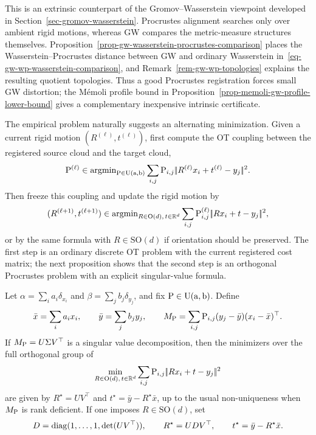 This is an extrinsic counterpart of the Gromov--Wasserstein viewpoint developed in Section~\ref{sec-gromov-wasserstein}. Procrustes alignment searches only over ambient rigid motions, whereas GW compares the metric-measure structures themselves. Proposition~\ref{prop-gw-wasserstein-procrustes-comparison} places the Wasserstein--Procrustes distance between GW and ordinary Wasserstein in~\eqref{eq-gw-wp-wasserstein-comparison}, and Remark~\ref{rem-gw-wp-topologies} explains the resulting quotient topologies. Thus a good Procrustes registration forces small GW distortion; the M\'emoli profile bound in Proposition~\ref{prop-memoli-gw-profile-lower-bound} gives a complementary inexpensive intrinsic certificate.

The empirical problem naturally suggests an alternating minimization. Given a current rigid motion $(R^{(\ell)},t^{(\ell)})$, first compute the OT coupling between the registered source cloud and the target cloud,
\begin{equation}\label{eq-wasserstein-procrustes-coupling-update}
	\P^{(\ell)}
	\in
	\argmin_{\P\in\CouplingsD(\a,\b)}
	\sum_{i,j}\P_{i,j}\norm{R^{(\ell)}x_i+t^{(\ell)}-y_j}^2.
\end{equation}
Then freeze this coupling and update the rigid motion by
\begin{equation}\label{eq-wasserstein-procrustes-rigid-update}
	(R^{(\ell+1)},t^{(\ell+1)})
	\in
	\argmin_{R\in\mathrm O(d),\,t\in\RR^d}
	\sum_{i,j}\P^{(\ell)}_{i,j}\norm{Rx_i+t-y_j}^2,
\end{equation}
or by the same formula with $R\in\mathrm{SO}(d)$ if orientation should be preserved. The first step is an ordinary discrete OT problem with the current registered cost matrix; the next proposition shows that the second step is an orthogonal Procrustes problem with an explicit singular-value formula.

\begin{prop}\label{prop-wasserstein-procrustes-rigid-update}
	Let $\alpha=\sum_i a_i\delta_{x_i}$ and $\beta=\sum_j b_j\delta_{y_j}$, and fix $\P\in\CouplingsD(\a,\b)$. Define
	\[
		\bar x=\sum_i a_i x_i,\qquad
		\bar y=\sum_j b_j y_j,\qquad
		M_\P=\sum_{i,j} \P_{i,j}(y_j-\bar y)(x_i-\bar x)^\top.
	\]
	If $M_\P=U\Sigma V^\top$ is a singular value decomposition, then the minimizers over the full orthogonal group of
	\[
		\min_{R\in\mathrm O(d),\,t\in\RR^d}
		\sum_{i,j}\P_{i,j}\norm{Rx_i+t-y_j}^2
	\]
	are given by $R^\star=UV^\top$ and $t^\star=\bar y-R^\star\bar x$, up to the usual non-uniqueness when $M_\P$ is rank deficient. If one imposes $R\in\mathrm{SO}(d)$, set
	\[
		D=\diag(1,\ldots,1,\det(UV^\top)),
		\qquad
		R^\star=UDV^\top,
		\qquad
		t^\star=\bar y-R^\star\bar x.
	\]
\end{prop}

